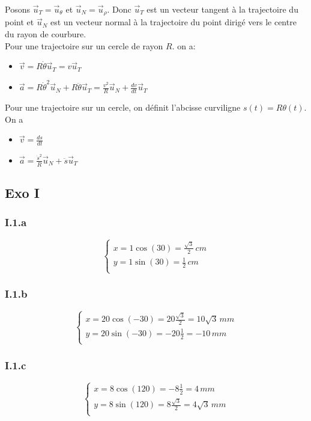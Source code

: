 \documentclass[]{book}
\theoremstyle{definition}
\begin{document}
Posons $\vec{u}_{T} = \vec{u}_{\theta}$ et $\vec{u}_{N} = \vec{u}_{\rho}$. Donc $\vec{u}_{T}$ est un vecteur tangent \`a la trajectoire du point et $\vec{u}_{N}$ est un vecteur normal \`a la trajectoire du point dirig\'e vers le centre du rayon de courbure.\\

Pour une trajectoire sur un cercle de rayon $R$. on a:

\begin{itemize}
\item $\vec{v} = R\dot{\theta}\vec{u}_{T} = v\vec{u}_{T}$
\item $\vec{a} = R\dot{\theta}^2\vec{u}_{N} + R\ddot{\theta}\vec{u}_{T}= \frac{v^2}{R}\vec{u}_{N} + \frac{dv}{dt}\vec{u}_{T}$
\end{itemize}


Pour une trajectoire sur un cercle, on d\'efinit l'abcisse curviligne $s(t)=R\theta(t)$. On a
\begin{itemize}
\item $\vec{v} = \frac{ds}{dt}$
\item $\vec{a} = \frac{\dot{s}^2}{R}\vec{u}_{N} + \ddot{s}\vec{u}_{T}$
\end{itemize}



\subsection*{Exo I}
\subsubsection*{I.1.a}
$$
\left\{
\begin{array}{l }
	x = 1 \cos(30) =  \frac{\sqrt{3}}{2}\, cm\\
	y = 1 \sin(30) =  \frac{1}{2}\, cm\\
\end{array}
\right. 
$$

\subsubsection*{I.1.b}
$$
\left\{
\begin{array}{l }
	x = 20 \cos(-30) =  20 \frac{\sqrt{3}}{2} = 10\sqrt{3}\, mm\\
	y = 20 \sin(-30) =  -20 \frac{1}{2} = -10\, mm\\
\end{array}
\right. 
$$

\subsubsection*{I.1.c}
$$
\left\{
\begin{array}{l }
	x = 8 \cos(120) =  -8 \frac{1}{2} = 4\, mm\\
	y = 8 \sin(120) =  8 \frac{\sqrt{3}}{2} = 4\sqrt{3}\, mm\\
\end{array}
\right. 
$$
\end{document}
